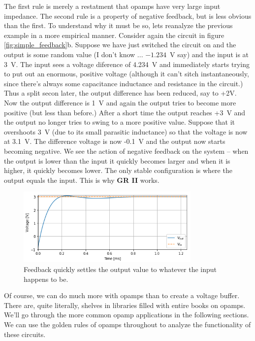 \documentclass[]{article}
\begin{document}
The first rule is merely a restatment that opamps have very large input impedance. The second rule is a property of negative feedback, but is less obvious than the first. To understand why it must be so, lets reanalyze the previous example in a more empirical manner. Consider again the circuit in figure \ref{fig:simple_feedback}b. Suppose we have just switched the circuit on and the output is some random value (I don't know ... $-1.234$~V say) and the input is at 3~V. The input sees a voltage diference of 4.234~V and immediately starts trying to put out an enormous, positive voltage (although it can't sitch instantaneously, since there's always some capacitance inductance and resistance in the circuit.) Thus a split secon later, the output difference has been reduced, say to +2V. Now the output difference is 1~V and again the output tries to become more positive (but less than before.) After a short time the output reaches +3~V and the output no longer tries to swing to a more positive value. Suppose that it overshoots 3~V (due to its small parasitic inductance) so that the voltage is now at 3.1~V. The difference voltage is now -0.1~V and the output now starts becoming negative. We see the action of negative feedback on the system -- when the output is lower than the input it quickly becomes larger and when it is higher, it quickly becomes lower. The only stable configuration is where the output equals the input. This is why \textbf{GR II} works. 

\begin{figure}[ht]
\caption{Feedback quickly settles the output value to whatever the input happens to be.}
\label{fig:feedback_time_dep}
\begin{center}
\includegraphics[width = 0.8\textwidth]{Images/feedback_time_dep.png}
\end{center}
\end{figure}

Of course, we can do much more with opamps than to create a voltage buffer. There are, quite literally, shelves in libraries filled with entire books on opamps. We'll go through the more common opamp applications in the following sections. We can use the golden rules of opamps throughout to analyze the functionality of these circuits.
\end{document}

